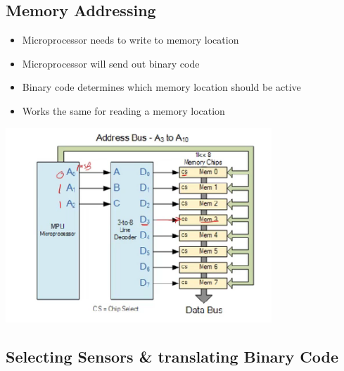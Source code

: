 \documentclass[a4paper,12pt]{article}
\begin{document}
                  \subsection{Memory Addressing}
                    \begin{itemize}
                      \item Microprocessor needs to write to memory location
                      \item Microprocessor will send out binary code
                      \item Binary code determines which memory location should be active
                      \item Works the same for reading a memory location
                    \end{itemize}
                    \includegraphics[width=10cm]{MemoryAdressing.png}

                  \subsection*{Selecting Sensors \& translating Binary Code}
\end{document}
